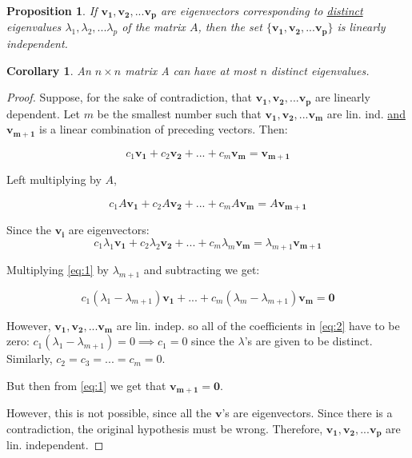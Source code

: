 \documentclass[]{extarticle}
\theoremstyle{Simple}
\newtheorem{prop}[thm]{Proposition}
\newtheorem{cor}{Corollary}[thm]
\theoremstyle{definition}
\theoremstyle{remark}
\theoremstyle{example}
\begin{document}
\begin{prop} \label{prop:50}
If $\bm{v_{1}, v_{2}, ... v_{p}}$ are eigenvectors corresponding to \underline{distinct} eigenvalues ${\lambda_{1}, \lambda_{2}, ... \lambda_{p}}$ of the matrix $A$, then the set $\{\bm{v_{1}, v_{2}, ... v_{p}}\}$ is linearly independent.
\end{prop}

\begin{cor}
An $n \times n$ matrix A can have at most $n$ distinct eigenvalues.
\end{cor}

\begin{proof}
Suppose, for the sake of contradiction, that $\bm{v_{1}, v_{2}, ... v_{p}}$ are linearly dependent. Let $m$ be the smallest number such that $\bm{v_{1}, v_{2}, ... v_{m}}$ are lin. ind. \underline{and} $\bm{v_{m+1}}$ is a linear combination of preceding vectors. Then:

\begin{equation} \label{eq:1}
c_{1}\bm{v_{1}} + c_{2}\bm{v_{2}} + ... + c_{m}\bm{v_{m}} = \bm{v_{m+1}}
\end{equation}

Left multiplying by $A$, 

$$
c_{1}A\bm{v_{1}} + c_{2}A\bm{v_{2}} + ... + c_{m}A\bm{v_{m}} = A\bm{v_{m+1}}
$$

Since the $\bm{v_{i}}$ are eigenvectors: 
$$
c_{1}\lambda_{1}\bm{v_{1}} + c_{2}\lambda_{2}\bm{v_{2}} + ... + c_{m}\lambda_{m}\bm{v_{m}} = \lambda_{m+1}\bm{v_{m+1}}
$$

Multiplying \eqref{eq:1} by $\lambda_{m+1}$ and subtracting we get:

\begin{equation} \label{eq:2}
c_{1}(\lambda_{1} - \lambda_{m+1})\bm{v_{1}} + ... + c_{m}(\lambda_{m} - \lambda_{m+1})\bm{v_{m}} = \bm{0}
\end{equation}

However, $\bm{v_{1}, v_{2}, ... v_{m}}$ are lin. indep. so all of the coefficients in \eqref{eq:2} have to be zero: $c_{1}(\lambda_{1} - \lambda_{m+1}) = 0 \implies c_{1} = 0$ since the $\lambda$'s are given to be distinct. Similarly, $c_{2} = c_{3} = ... = c_{m} = 0$.

But then from \eqref{eq:1} we get that $\bm{v_{m+1}} = \bm{0}$.

However, this is not possible, since all the $\bm{v}$'s are eigenvectors.
Since there is a contradiction, the original hypothesis must be wrong.
Therefore, $\bm{v_{1}, v_{2}, ... v_{p}}$ are lin. independent.

\end{proof}
\end{document}
